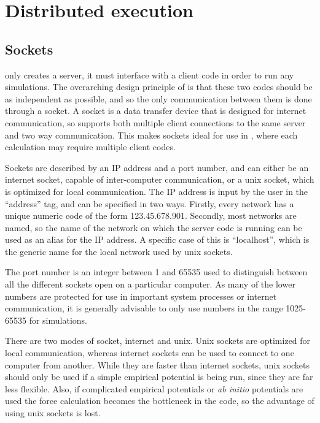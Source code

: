 \documentclass[11pt,english,fleqn]{report}
\begin{document}
\section{Distributed execution}

\label{distrib}


\subsection{Sockets}

\ipi only creates a server, it must interface with a client code
in order to run any simulations. The overarching design principle
of \ipi is that these two codes should be as independent as possible,
and so the only communication between them is done through a socket.
A socket is a data transfer device that is designed for internet communication,
so supports both multiple client connections to the same server and
two way communication. This makes sockets ideal for use in \ipi,
where each calculation may require multiple client codes. 

Sockets are described by an IP address and a port number, and can
either be an internet socket, capable of inter-computer communication,
or a unix socket, which is optimized for local communication. The
IP address is input by the user in the {}``address'' tag, and can
be specified in two ways. Firstly, every network has a unique numeric
code of the form 123.45.678.901. Secondly, most networks are named,
so the name of the network on which the server code is running can
be used as an alias for the IP address. A specific case of this is
{}``localhost'', which is the generic name for the local network
used by unix sockets.

The port number is an integer between 1 and 65535 used to distinguish
between all the different sockets open on a particular computer. As
many of the lower numbers are protected for use in important system
processes or internet communication, it is generally advisable to
only use numbers in the range 1025-65535 for simulations.

There are two modes of socket, internet and unix. Unix sockets are
optimized for local communication, whereas internet sockets can be
used to connect to one computer from another. While they are faster
than internet sockets, unix sockets should only be used if a simple
empirical potential is being run, since they are far less flexible.
Also, if complicated empirical potentials or \emph{ab initio} potentials
are used the force calculation becomes the bottleneck in the code,
so the advantage of using unix sockets is lost. 
\end{document}
